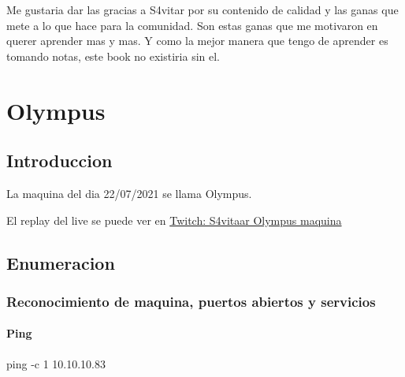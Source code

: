 \documentclass{assets/ipesethesis}
\newenvironment{Shaded}{\begin{snugshade}}{\end{snugshade}}
\newcommand{\FunctionTok}[1]{\textcolor[rgb]{0.00,0.00,0.00}{#1}}
\newcommand{\NormalTok}[1]{#1}
\begin{document}
Me gustaria dar las gracias a S4vitar por su contenido de calidad y las ganas que mete a lo que hace para la comunidad.
Son estas ganas que me motivaron en querer aprender mas y mas. Y como la mejor manera que tengo de aprender es tomando notas,
este book no existiria sin el.

\hypertarget{olympus}{%
\chapter*{Olympus}\label{olympus}}

\hypertarget{introduccion}{%
\section*{Introduccion}\label{introduccion}}

La maquina del dia 22/07/2021 se llama Olympus.

El replay del live se puede ver en \href{https://www.twitch.tv/videos/1094808182}{Twitch: S4vitaar Olympus maquina}

\hypertarget{enumeracion}{%
\section*{Enumeracion}\label{enumeracion}}

\hypertarget{reconocimiento-de-maquina-puertos-abiertos-y-servicios}{%
\subsection*{Reconocimiento de maquina, puertos abiertos y servicios}\label{reconocimiento-de-maquina-puertos-abiertos-y-servicios}}

\hypertarget{ping}{%
\subsubsection*{Ping}\label{ping}}

\begin{Shaded}
\begin{Highlighting}[]
\FunctionTok{ping}\NormalTok{ -c 1 10.10.10.83}
\end{Highlighting}
\end{Shaded}
\end{document}
